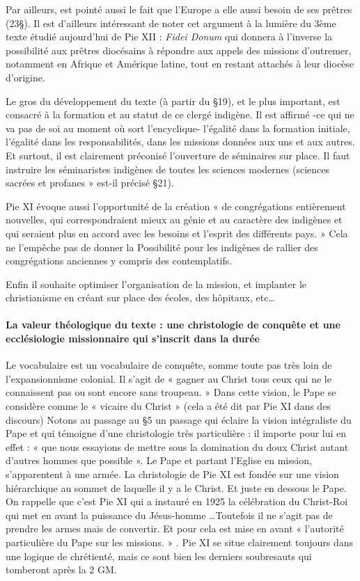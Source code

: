 Par ailleurs, est pointé aussi le fait que l’Europe a elle aussi besoin de ses prêtres (23§). Il est d’ailleurs intéressant de noter cet argument à la lumière du 3ème texte étudié aujourd’hui de Pie XII : \textit{Fidei Donum} qui donnera à l’inverse la possibilité aux prêtres diocésains à répondre aux appels des missions d'outremer, notamment en Afrique et Amérique latine, tout en restant attachés à leur diocèse d'origine.

Le gros du développement du texte (à partir du §19), et le plus important, est consacré à la formation et au statut de ce clergé indigène. Il est affirmé -ce qui ne va pas de soi au moment où sort l’encyclique-  l’égalité dans la formation initiale, l’égalité dans les responsabilités, dans les missions données aux uns et aux autres. Et surtout, il est clairement préconisé l’ouverture de séminaires sur place. Il faut instruire les séminaristes indigènes de toutes les sciences modernes (sciences sacrées et profanes » est-il précisé §21). 

Pie XI évoque aussi l’opportunité de la création « de congrégations entièrement nouvelles, qui correspondraient mieux au génie et au caractère des indigènes et qui seraient plus en accord avec les besoins et l’esprit des différents pays. » Cela ne l’empêche pas de donner la Possibilité pour les indigènes de rallier des congrégations anciennes y compris des contemplatifs. 

Enfin il souhaite optimiser l’organisation de la mission, et implanter le christianisme en créant sur place des écoles, des hôpitaux, etc… 

 \paragraph{La valeur théologique du texte : une christologie de conquête et une ecclésiologie missionnaire qui s’inscrit dans la durée}


Le vocabulaire est un vocabulaire de conquête, somme toute pas très loin de l’expansionnisme colonial. Il s’agit de « gagner au Christ tous ceux qui ne le connaissent pas ou sont encore sans troupeau. »  Dans cette vision, le Pape se considère comme le « vicaire du Christ » (cela a été dit par Pie XI dans des discours)
Notons au passage au §5 un passage qui éclaire la vision intégraliste du Pape et qui témoigne d’une christologie très particulière : il importe pour lui en effet : « que nous essayions de mettre sous la domination du doux Christ autant d’autres hommes que possible ». Le Pape et partant l’Eglise en mission, s’apparentent à une armée. La christologie de Pie XI est fondée sur une vision hiérarchique au sommet de laquelle il y a le Christ. Et juste en dessous le Pape.  On rappelle que c’est Pie XI qui a instauré en 1925 la célébration du Christ-Roi qui met en avant la puissance du Jésus-homme …Toutefois il ne s’agit pas de prendre les armes mais de convertir. Et pour cela est mise en avant « l’autorité particulière du Pape sur les missions. » . Pie XI se situe clairement toujours dans une logique de chrétienté, mais ce sont bien les derniers soubresauts qui tomberont après la 2 GM.


